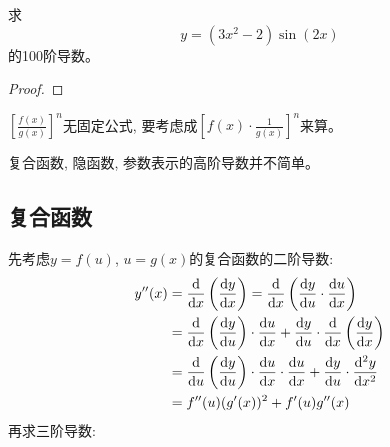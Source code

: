 \begin{example}
    求
    \begin{equation*}
        y = (3x^2-2)\sin(2x)
    \end{equation*}
    的100阶导数。
\end{example}
\begin{proof}
    
\end{proof}

$\left[\frac{f(x)}{g(x)}\right]^{n}$无固定公式, 要考虑成$\left[f(x)\cdot\frac{1}{g(x)}\right]^{n}$来算。

复合函数, 隐函数, 参数表示的高阶导数并不简单。
\subsection{复合函数}
先考虑$y = f(u)$, $u = g(x)$的复合函数的二阶导数:
\begin{equation*}
    \begin{aligned}
        y''(x) &= \der{}{x} \left( \der{y}{x}\right) = \der{}{x} \left( \der{y}{u} \cdot \der{u}{x}\right) \\
        &= \der{}{x}\left(\der{y}{u}\right)\cdot\der{u}{x} + \der{y}{u}\cdot\der{}{x}\left( \der{y}{x}\right) \\ 
        &= \der{}{u}\left(\der{y}{u}\right)\cdot\der{u}{x}\cdot\der{u}{x} + \der{y}{u}\cdot\dern{2}{y}{x} \\
        &= f''(u)(g'(x))^2+f'(u)g''(x)
    \end{aligned}
\end{equation*}
再求三阶导数:

